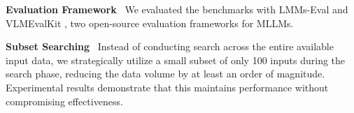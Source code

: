 \noindent\textbf{Evaluation Framework} \ We evaluated the benchmarks with LMMs-Eval \cite{lmms-eval} and VLMEvalKit \cite{vlmevalkit}, two open-source evaluation frameworks for MLLMs.

\noindent\textbf{Subset Searching} \ Instead of conducting search across the entire available input data, we strategically utilize a small subset of only 100 inputs during the search phase, reducing the data volume by at least an order of magnitude. Experimental results demonstrate that this maintains performance without compromising effectiveness.

